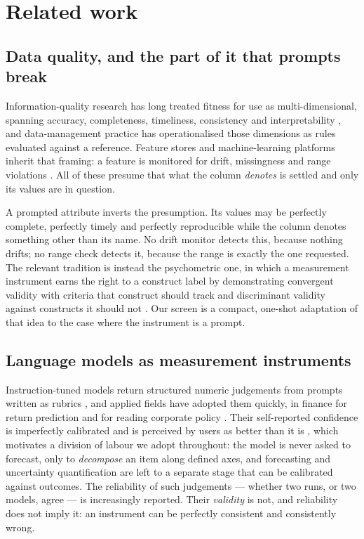 \documentclass[preprint,12pt,authoryear]{elsarticle}
\theoremstyle{plain}
\theoremstyle{remark}
\begin{document}
\section{Related work}\label{sec:related}

\subsection{Data quality, and the part of it that prompts break}

Information-quality research has long treated fitness for use as
multi-dimensional, spanning accuracy, completeness, timeliness, consistency and
interpretability \citep{wang1996,batini2009}, and data-management practice has
operationalised those dimensions as rules evaluated against a reference. Feature
stores and machine-learning platforms inherit that framing: a feature is
monitored for drift, missingness and range violations
\citep{polyzotis2018,breck2017}. All of these presume that what the column
\emph{denotes} is settled and only its values are in question.

A prompted attribute inverts the presumption. Its values may be perfectly
complete, perfectly timely and perfectly reproducible while the column denotes
something other than its name. No drift monitor detects this, because nothing
drifts; no range check detects it, because the range is exactly the one
requested. The relevant tradition is instead the psychometric one, in which a
measurement instrument earns the right to a construct label by demonstrating
convergent validity with criteria that construct should track and discriminant
validity against constructs it should not \citep{campbell1959,cronbach1955}. Our
screen is a compact, one-shot adaptation of that idea to the case where the
instrument is a prompt.

\subsection{Language models as measurement instruments}

Instruction-tuned models return structured numeric judgements from prompts
written as rubrics \citep{brown2020}, and applied fields have adopted them
quickly, in
finance for return prediction \citep{lopezlira2025} and for reading corporate
policy \citep{jha2024}. Their self-reported confidence is imperfectly calibrated
and is perceived by users as better than it is \citep{steyvers2025}, which
motivates a division of labour we adopt throughout: the model is never asked to
forecast, only to \emph{decompose} an item along defined axes, and forecasting
and uncertainty quantification are left to a separate stage that can be
calibrated against outcomes. The reliability of such judgements --- whether two
runs, or two models, agree --- is increasingly reported. Their \emph{validity}
is not, and reliability does not imply it: an instrument can be perfectly
consistent and consistently wrong.
\end{document}
